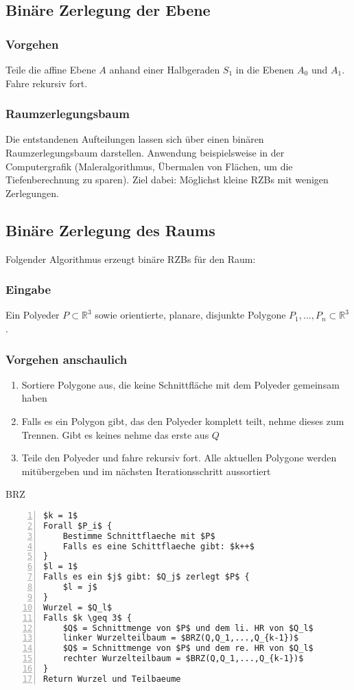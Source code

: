 \subsection{Binäre Zerlegung der Ebene}

\subsubsection{Vorgehen}
Teile die affine Ebene \(A\) anhand einer Halbgeraden \(S_1\) in die Ebenen \(A_0\) und \(A_1\). Fahre rekursiv fort.

\subsubsection{Raumzerlegungsbaum}
Die entstandenen Aufteilungen lassen sich über einen binären Raumzerlegungsbaum darstellen. Anwendung beispielsweise in der Computergrafik (Maleralgorithmus, Übermalen von Flächen, um die Tiefenberechnung zu sparen).
Ziel dabei: Möglichst kleine RZBs mit wenigen Zerlegungen.


\subsection{Binäre Zerlegung des Raums}
Folgender Algorithmus erzeugt binäre RZBs für den Raum:

\subsubsection{Eingabe}
Ein Polyeder \(P \subset \mathbb{R}^3\) sowie orientierte, planare, disjunkte Polygone \(P_1,...,P_n \subset \mathbb{R}^3\).

\subsubsection{Vorgehen anschaulich}
\begin{enumerate}
	\item Sortiere Polygone aus, die keine Schnittfläche mit dem Polyeder gemeinsam haben
	\item Falls es ein Polygon gibt, das den Polyeder komplett teilt, nehme dieses zum Trennen. Gibt es keines nehme das erste aus \(Q\)
	\item Teile den Polyeder und fahre rekursiv fort. Alle aktuellen Polygone werden mitübergeben und im nächsten Iterationsschritt aussortiert
\end{enumerate}

\begin{minipage}{\textwidth}
BRZ
\begin{lstlisting}[frame=single,numbers=left,mathescape]
$k = 1$
Forall $P_i$ {
	Bestimme Schnittflaeche mit $P$
	Falls es eine Schittflaeche gibt: $k++$
}
$l = 1$
Falls es ein $j$ gibt: $Q_j$ zerlegt $P$ {
	$l = j$
}
Wurzel = $Q_l$
Falls $k \geq 3$ {
	$Q$ = Schnittmenge von $P$ und dem li. HR von $Q_l$
	linker Wurzelteilbaum = $BRZ(Q,Q_1,...,Q_{k-1})$
	$Q$ = Schnittmenge von $P$ und dem re. HR von $Q_l$
	rechter Wurzelteilbaum = $BRZ(Q,Q_1,...,Q_{k-1})$
}
Return Wurzel und Teilbaeume
\end{lstlisting}
\end{minipage}


